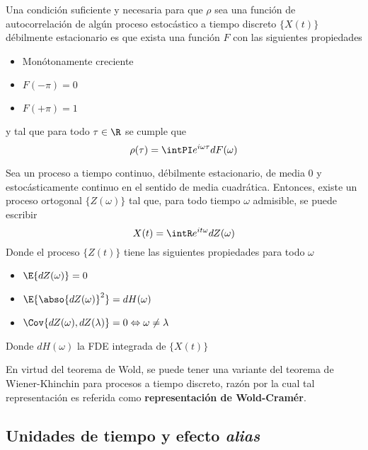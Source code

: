 \begin{teorema}[Wold]
Una condición suficiente y necesaria para que $\rho$ sea una función de autocorrelación de 
algún proceso estocástico a tiempo discreto $\{X(t)\}$ débilmente estacionario es que exista 
una función $F$ con las siguientes propiedades
\begin{itemize}
\item Monótonamente creciente
\item $F(-\pi) = 0$
\item $F(+\pi) = 1$
\end{itemize}
y tal que para todo $\tau \in \R$ se cumple que
\begin{equation*}
\rho(\tau) = \intPI e^{i \omega \tau} dF(\omega)
\end{equation*}
\label{t_wold}
\end{teorema}

\begin{teorema}
Sea \xt un proceso a tiempo continuo, débilmente estacionario, de media 0 y estocásticamente 
continuo en el sentido de media cuadrática. Entonces, existe un proceso 
ortogonal $\{Z(\omega)\}$ tal que, para todo tiempo $\omega$ admisible, se puede 
escribir
\begin{equation*}
X(t) = \intR e^{i t \omega} dZ(\omega)
\end{equation*}
Donde el proceso $\{Z(t)\}$ tiene las siguientes propiedades para todo $\omega$
\begin{itemize}
\item $\E{dZ(\omega)} = 0$
\item $\E{\abso{dZ(\omega)}^{2}} = dH(\omega)$
\item $\Cov{dZ(\omega),dZ(\lambda)} = 0 \Leftrightarrow \omega \neq \lambda$
\end{itemize}
Donde $dH(\omega)$ la FDE integrada de $\{X(t)\}$
\label{rep_espectral}
\end{teorema}

En virtud del teorema de Wold, se puede tener una variante del teorema de Wiener-Khinchin
para procesos a tiempo discreto, razón por la cual  
tal representación es referida como \textbf{representación de Wold-Cramér}.


\subsection{Unidades de tiempo y efecto \textit{alias}}


